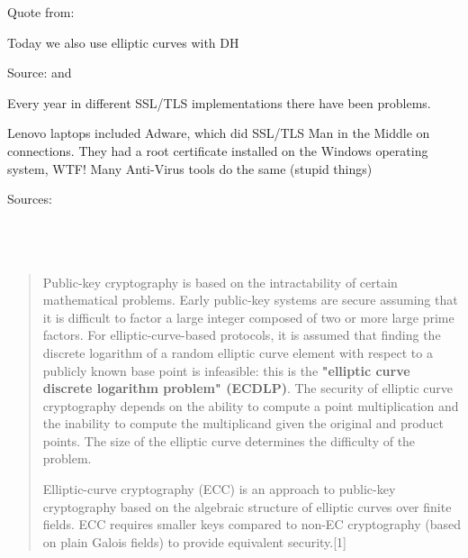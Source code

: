 \documentclass[Screen16to9,17pt]{foils}
\begin{document}
\begin{list2}
\item Quote from: {\small {}}
\item Today we also use elliptic curves with DH \\{\small {}}
\end{list2}



Source:  and \\

Every year in different SSL/TLS implementations there have been problems.



Lenovo laptops included Adware, which did SSL/TLS Man in the Middle on connections.
They had a root certificate installed on the Windows operating system, WTF!
Many Anti-Virus tools do the same (stupid things)

{\footnotesize Sources:\\
\\
\\
\\
}{\tiny{}
}




\begin{quote}
  Public-key cryptography is based on the intractability of certain mathematical problems. Early public-key systems are secure assuming that it is difficult to factor a large integer composed of two or more large prime factors. For elliptic-curve-based protocols, it is assumed that finding the discrete logarithm of a random elliptic curve element with respect to a publicly known base point is infeasible: this is the {\bf "elliptic curve discrete logarithm problem" (ECDLP)}. The security of elliptic curve cryptography depends on the ability to compute a point multiplication and the inability to compute the multiplicand given the original and product points. The size of the elliptic curve determines the difficulty of the problem.

Elliptic-curve cryptography (ECC) is an approach to public-key cryptography based on the algebraic structure of elliptic curves over finite fields. ECC requires smaller keys compared to non-EC cryptography (based on plain Galois fields) to provide equivalent security.[1]
\end{quote}
\end{document}
